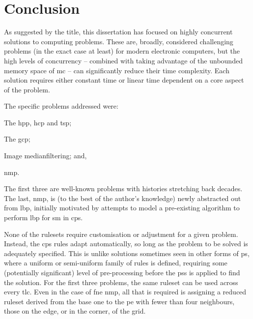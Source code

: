 \chapter{\label{chap:conc}Conclusion}


As suggested by the title, this dissertation has focused on highly concurrent solutions to computing problems.  These are, broadly, considered challenging problems (in the exact case at least) for modern electronic computers, but the high levels of concurrency -- combined with taking advantage of the unbounded memory space of \gls{mc} -- can significantly reduce their time complexity.  Each solution requires either constant time or linear time dependent on a core aspect of the problem.

The specific problems addressed were:
\begin{inparaenum}[(1)]
\item The \gls{hpp}, \gls{hcp} and \gls{tsp};
\item The \gls{gcp};
\item Image \gls{medianfilter}ing; and,
\item \gls{nmp}.
\end{inparaenum}
The first three are well-known problems with histories stretching back decades.  The last, \gls{nmp}, is (to the best of the author's knowledge) newly abstracted out from \gls{lbp}, initially motivated by attempts to model a pre-existing algorithm to perform \gls{lbp} for \gls{sm} in \gls{cps}.

None of the \glspl{ruleset} require customisation or adjustment for a given problem.  Instead, the \gls{cps} rules adapt automatically, so long as the problem to be solved is adequately specified.  This is unlike solutions sometimes seen in other forms of \gls{ps}, where a uniform or semi-uniform family of rules is defined, requiring some (potentially significant) level of pre-processing before the \glspl{ps} is applied to find the solution.  For the first three problems, the same ruleset can be used across every \gls{tlc}.  Even in the case of \gls{fne} \gls{nmp}, all that is required is assigning a reduced \gls{ruleset} derived from the base one to the \gls{pe} with fewer than four neighbours, \ie{} those on the edge, or in the corner, of the grid.

